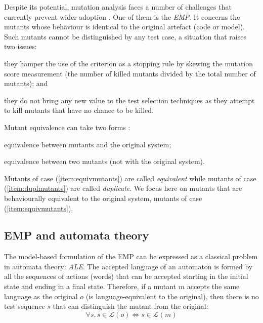 \label{sec:EMP}


Despite its potential, mutation analysis faces a number of challenges that currently prevent wider adoption \cite{Papadakis2015, Jia2011a}. One of them is the \textit{\gls{EMP}}. It concerns the mutants whose behaviour is identical to the original artefact (code or model). Such mutants cannot be distinguished by any test case, a situation that raises two issues: 
\begin{inparaenum}
\item they hamper the use of the criterion as a stopping rule by skewing the mutation score measurement (the number of killed mutants divided by the total number of mutants); and
\item they do not bring any new value to the test selection techniques as they attempt to kill mutants that have no chance to be killed. 
\end{inparaenum}

Mutant equivalence  can take two forms \cite{Papadakis2015}: 
\begin{inparaenum}
\item equivalence between mutants and the original system; \label{item:equivmutants}
\item equivalence between two mutants (not with the original system). \label{item:duplmutants}
\end{inparaenum}
Mutants of case (\ref{item:equivmutants}) are called \emph{equivalent} while mutants of case (\ref{item:duplmutants}) are called \emph{duplicate}. We focus here on mutants that are behaviourally equivalent to the original system, \ie mutants of case (\ref{item:equivmutants}).   

\subsection{\gls{EMP} and automata theory}


The model-based formulation of the \gls{EMP} can be expressed as a classical problem in automata theory: \emph{\gls{ALE}}. The accepted language of an automaton is formed by all the sequences of actions (words)  that can be accepted \ie starting in the initial state and ending in a final state. Therefore, if a mutant $m$ accepts the same language as the original $o$ (\ie is language-equivalent to the original), then there is no test sequence $s$ that can distinguish the mutant from the original:
$$ \forall s, s \in \mathcal{L}(o) \Leftrightarrow s \in \mathcal{L}(m)$$

